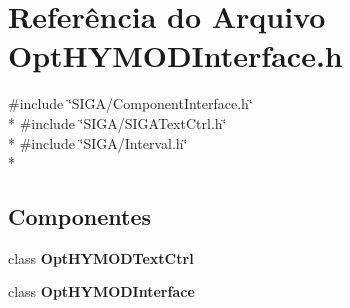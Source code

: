 \section{Referência do Arquivo Opt\+H\+Y\+M\+O\+D\+Interface.\+h}
\label{_opt_h_y_m_o_d_interface_8h}
{\ttfamily \#include \char`\"{}S\+I\+G\+A/\+Component\+Interface.\+h\char`\"{}}\\*
{\ttfamily \#include \char`\"{}S\+I\+G\+A/\+S\+I\+G\+A\+Text\+Ctrl.\+h\char`\"{}}\\*
{\ttfamily \#include \char`\"{}S\+I\+G\+A/\+Interval.\+h\char`\"{}}\\*
\subsection*{Componentes}
\begin{DoxyCompactItemize}
\item 
class {\bf Opt\+H\+Y\+M\+O\+D\+Text\+Ctrl}
\item 
class {\bf Opt\+H\+Y\+M\+O\+D\+Interface}
\end{DoxyCompactItemize}
